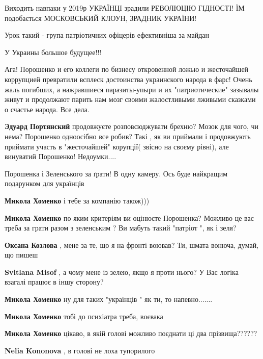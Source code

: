 \begin{itemize}
Виходить навпаки у 2019р УКРАЇНЦІ зрадили РЕВОЛЮЦІЮ ГІДНОСТІ! ЇМ подобається МОСКОВСЬКИЙ КЛОУН, ЗРАДНИК УКРАЇНИ!

Урок такий - група патріотичних офіцерів ефективніша за майдан

У Украины большое будущее!!!


Ага! Порошенко и его коллеги по бизнесу откровенной ложью и жесточайшей
коррупцией превратили всплеск достоинства украинского народа в фарс! Очень жаль
погибших, а нажравшиеся паразиты-упыри и их "патриотические" зазывалы живут и
продолжают парить нам мозг своими жалостливыми лживыми сказками о счастье
народа. Все дела.

\begin{itemize} %
\textbf{Эдуард Портянский} продовжуєте розповсюджувати брехню? Мозок для чого, чи нема? Порошенко одноосібно все робив? Такі , як ви приймали і продовжують приймати участь в "жесточайшей" корупції( звісно на своєму рівні), але винуватий Порошенко! Недоумки....
\end{itemize} %


Порошенка і Зеленського за ґрати! В одну камеру. Ось буде найкращим подарунком
для українців

\begin{itemize} %
\textbf{Микола Хоменко} і тебе за компанію також)))

\textbf{Микола Хоменко} по яким критеріям ви оцінюєте Порошенка?
Можливо це вас треба за грати разом з зеленським ? Ви мабуть такий "патріот ", як і зеля?

\textbf{Оксана Козлова} , мене за те, що я на фронті воював? Ти, шмата вонюча, думай, що пишеш

\textbf{Svitlana Misof} , а чому мене із зелею, якщо я проти нього? У Вас логіка взагалі працює в іншу сторону?

\textbf{Микола Хоменко} ну для таких "українців " як ти, то напевно.......

\textbf{Микола Хоменко} тобі до психіатра треба, воєвака

\textbf{Микола Хоменко} цікаво, в якій голові можливо поєднати ці два прізвища??????

\textbf{Nelia Kononova} , в голові не лоха тупорилого


\end{itemize}
\end{itemize}
